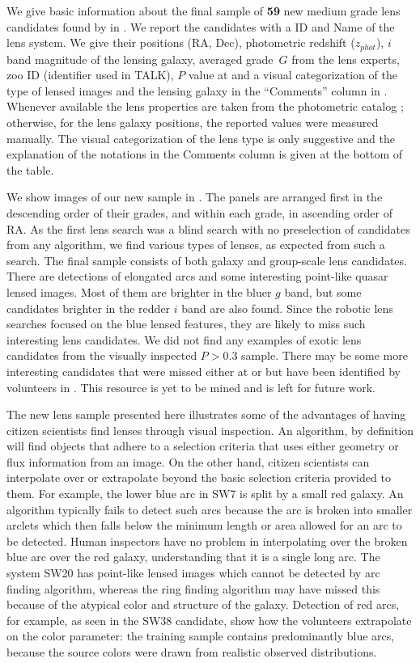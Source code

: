 \documentclass[useAMS,usenatbib,a4paper]{mn2e}
\begin{document}
We give basic information about the final sample of {\bf 59} new medium grade
lens candidates found by \sw in
. We report the candidates with a \sw ID and Name
of the lens system. We give their positions (RA, Dec), photometric
redshift ($z_{phot}$), $i$ band magnitude of the lensing galaxy,
averaged grade~$G$ from the lens experts, zoo ID (identifier used in
TALK), $P$ value at \StageTwo and a visual categorization of the type of
lensed images and the lensing galaxy in the ``Comments'' column in
. Whenever available the lens properties are
taken from the \cfhtls photometric catalog \citep{Coupon2009}; otherwise,
for the lens galaxy positions, the reported values were measured
manually. The visual categorization of the lens type is only suggestive
and the explanation of the notations in the Comments column is given at
the bottom of the table.

We show images of our new sample in . The panels are arranged
first in the descending order of their grades, and within each grade, in
ascending order
of RA. As the first lens search was a blind search with no
preselection of candidates from any algorithm, we find various types of
lenses, as expected from such a search. The final sample consists of
both galaxy and group-scale lens candidates. There are detections of
elongated arcs and some interesting point-like quasar lensed images.
Most of them are brighter in the bluer $g$ band, but some candidates brighter
in the redder $i$ band are also found. Since the robotic lens searches
focused on the blue lensed features, they are likely to miss
such interesting lens candidates. We did not find any examples of
exotic lens candidates from the visually inspected $P>0.3$ sample.
There
may be some more interesting candidates that were missed either at
\StageOne or \StageTwo but have been identified by volunteers in \Talk.
This resource is yet to be mined and is left for future work.

The new \sw lens sample presented here illustrates some of
the advantages of having
citizen scientists find lenses through visual inspection. An algorithm,
by definition will find objects that adhere to a selection criteria that
uses either geometry or flux information from an image. On the other
hand, citizen scientists can interpolate over or
extrapolate beyond the basic selection criteria provided to them.  For
example, the lower blue arc in SW7 is split by a small red galaxy.  An
algorithm typically fails to detect such arcs because the arc is broken
into smaller arclets which then falls below the minimum length or area
allowed for an arc to be detected. Human inspectors have no
problem in interpolating over the broken blue arc over the red galaxy,
understanding that it is a single long arc. The system SW20 has
point-like lensed images which cannot be detected by arc finding
algorithm, whereas the ring finding algorithm may have missed this because of
the atypical color and structure of the galaxy. Detection of red arcs, for
example, as seen in the SW38 candidate, show how the volunteers
extrapolate on the color parameter: the training sample contains
predominantly blue arcs, because the source colors were drawn from realistic
observed distributions.
\end{document}
